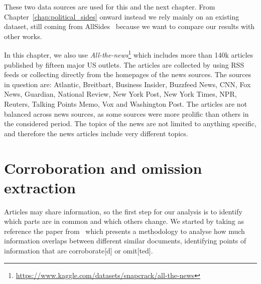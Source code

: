 

These two data sources are used for this and the next chapter. From Chapter~\ref{chap:political_sides} onward instead we rely mainly on an existing dataset, still coming from AllSides~\citep{baly2020we} because we want to compare our results with other works.

In this chapter, we also use \emph{All-the-news}\footnote{\url{https://www.kaggle.com/datasets/snapcrack/all-the-news}} which includes more than 140k articles published by fifteen major US outlets.
The articles are collected by using RSS feeds or collecting directly from the homepages of the news sources. The sources in question are: Atlantic, Breitbart, Business Insider, Buzzfeed News, CNN, Fox News, Guardian, National Review, New York Post, New York Times, NPR, Reuters, Talking Points Memo, Vox and Washington Post.
The articles are not balanced across news sources, as some sources were more prolific than others in the considered period.
The topics of the news are not limited to anything specific, and therefore the news articles include very different topics.


\section{\statusgreen Corroboration and omission extraction}
\label{sec:cgs_cross_referencing}
Articles may share information, so the first step for our analysis is to identify which parts are in common and which others change.
We started by taking as reference the paper from~\citet{bountouridis2018explaining} which presents a methodology to analyse how much information overlaps between different similar documents, identifying points of information that are \gls{corroborate}[d] or \gls{omit}[ted].

